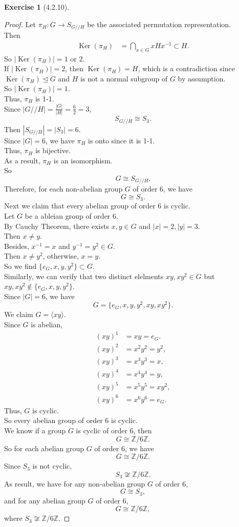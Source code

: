 \documentclass{amsart}
\newcommand{\bbz}{\mathbb{Z}}
\renewcommand{\ker}{\operatorname{Ker}}
\theoremstyle{plain}
\theoremstyle{definition}
\newtheorem{exer}[lem]{Exercise}
\begin{document}
\begin{exer}[4.2.10]
\begin{proof}
Let $\pi_H: G \to S_{G//H}$ be the associated permutation representation.\\
Then
\begin{align*}
	\ker(\pi_H) &= \bigcap_{x\in G}xHx^{-1} \subset  H.
\end{align*}
So $|\ker(\pi_H)| = 1$ or $2$.\\
If $|\ker(\pi_H)| =2$, then $\ker(\pi_H) = H$, which is a contradiction since $\ker(\pi_H) \unlhd G$ and $H$ is not a normal subgroup of $G$ by assumption.\\
So $|\ker(\pi_H)| = 1$.\\
Thus, $\pi_H$ is 1-1.\\
Since $\left|G//H\right| = \frac{|G|}{|H|} = \frac{6}{2} = 3$,\\
\[ S_{G//H} \cong S_3. \]
Then $|S_{G//H}| = |S_3| = 6$.\\
Since $|G| = 6$, we have $\pi_H$ is onto since it is 1-1.\\
Thus, $\pi_H$ is bijective.\\
As a result, $\pi_H$ is an isomorphism.\\
So 
\[G \cong S_{G//H}.\]
Therefore, for each non-abelian group $G$ of order 6, we have
\[G \cong S_3. \]
Next we claim that every abelian group of order 6 is cyclic.\\
Let $G$ be a ableian group of order 6.\\
By Cauchy Theorem, there exists $x,y \in G$ and $|x| = 2, |y|= 3$.\\
Then $x \neq y$.\\
Besides, $x^{-1} = x$ and $y^{-1} = y^2 \in G$.\\
Then $x \neq y^2$, otherwise, $x=y$.\\
So we find $\{e_G,x,y,y^2\} \subset G$.\\
Similarly, we can verify that two distinct elelments $xy,xy^2 \in G$ but $xy,xy^2 \not\in \{e_G,x,y,y^2\}$.\\
Since $|G|=6$, we have
\[ G=\{e_G,x,y,y^2,xy,xy^2\}.\]
We claim $G=\langle xy \rangle$.\\
Since $G$ is abelian,
\begin{align*}
  (xy)^1 &= xy =e_G.\\
  (xy)^2 &=x^2y^2 =y^2,\\
  (xy)^3 &=x^3y^3 = x,\\
  (xy)^4 &=x^4y^4 = y,\\
  (xy)^5 &=x^5y^5 = xy^2,\\
  (xy)^6 &= x^6y^6 = e_G.
\end{align*}
Thus, $G$ is cyclic.\\
So every abelian group of order 6 is cyclic.\\
We know if a group $G$ is cyclic of order 6, then 
\[G \cong \bbz/6\bbz.\]
So for each abelian group $G$ of order 6, we have 
\[ G \cong \bbz/6\bbz.\]
Since $S_3$ is not cyclic,
\[S_3 \not\cong \bbz/6\bbz.\]
As result, we have for any non-abelian group $G$ of order 6, 
\[G \cong S_3, \] 
and for any abelian group $G$ of order 6,
\[G \cong \bbz/6\bbz,\]
where $S_3 \not\cong \bbz/6\bbz$.
\end{proof}
\end{exer}
\end{document}
